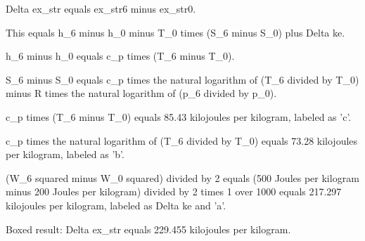 Delta ex_str equals ex_str6 minus ex_str0.

This equals h_6 minus h_0 minus T_0 times (S_6 minus S_0) plus Delta ke.

h_6 minus h_0 equals c_p times (T_6 minus T_0).

S_6 minus S_0 equals c_p times the natural logarithm of (T_6 divided by T_0) minus R times the natural logarithm of (p_6 divided by p_0).

c_p times (T_6 minus T_0) equals 85.43 kilojoules per kilogram, labeled as 'c'.

c_p times the natural logarithm of (T_6 divided by T_0) equals 73.28 kilojoules per kilogram, labeled as 'b'.

(W_6 squared minus W_0 squared) divided by 2 equals (500 Joules per kilogram minus 200 Joules per kilogram) divided by 2 times 1 over 1000 equals 217.297 kilojoules per kilogram, labeled as Delta ke and 'a'.

Boxed result: Delta ex_str equals 229.455 kilojoules per kilogram.